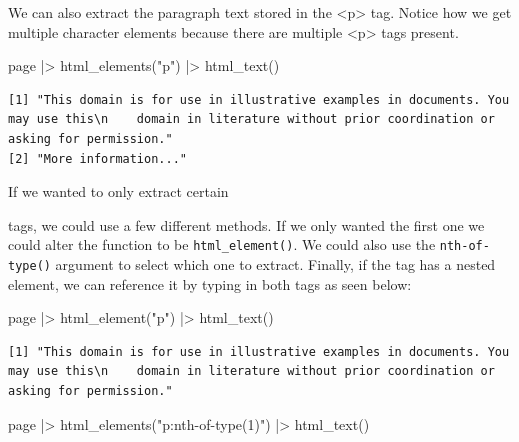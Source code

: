 \documentclass[
  letterpaper,
  DIV=11,
  numbers=noendperiod]{scrreprt}
\newenvironment{Shaded}{\begin{snugshade}}{\end{snugshade}}
\newcommand{\FunctionTok}[1]{\textcolor[rgb]{0.28,0.35,0.67}{#1}}
\newcommand{\NormalTok}[1]{\textcolor[rgb]{0.00,0.23,0.31}{#1}}
\newcommand{\SpecialCharTok}[1]{\textcolor[rgb]{0.37,0.37,0.37}{#1}}
\newcommand{\StringTok}[1]{\textcolor[rgb]{0.13,0.47,0.30}{#1}}
\begin{document}
We can also extract the paragraph text stored in the
\textless p\textgreater{} tag. Notice how we get multiple character
elements because there are multiple \textless p\textgreater{} tags
present.

\begin{Shaded}
\begin{Highlighting}[]
\NormalTok{page }\SpecialCharTok{|\textgreater{}} \FunctionTok{html\_elements}\NormalTok{(}\StringTok{"p"}\NormalTok{) }\SpecialCharTok{|\textgreater{}} \FunctionTok{html\_text}\NormalTok{()}
\end{Highlighting}
\end{Shaded}

\begin{verbatim}
[1] "This domain is for use in illustrative examples in documents. You may use this\n    domain in literature without prior coordination or asking for permission."
[2] "More information..."                                                                                                                                          
\end{verbatim}

If we wanted to only extract certain

tags, we could use a few different methods. If we only wanted the first
one we could alter the function to be \texttt{html\_element()}. We could
also use the \texttt{nth-of-type()} argument to select which one to
extract. Finally, if the tag has a nested element, we can reference it
by typing in both tags as seen below:

\begin{Shaded}
\begin{Highlighting}[]
\NormalTok{page }\SpecialCharTok{|\textgreater{}} \FunctionTok{html\_element}\NormalTok{(}\StringTok{"p"}\NormalTok{) }\SpecialCharTok{|\textgreater{}} \FunctionTok{html\_text}\NormalTok{()}
\end{Highlighting}
\end{Shaded}

\begin{verbatim}
[1] "This domain is for use in illustrative examples in documents. You may use this\n    domain in literature without prior coordination or asking for permission."
\end{verbatim}

\begin{Shaded}
\begin{Highlighting}[]
\NormalTok{page }\SpecialCharTok{|\textgreater{}} \FunctionTok{html\_elements}\NormalTok{(}\StringTok{"p:nth{-}of{-}type(1)"}\NormalTok{) }\SpecialCharTok{|\textgreater{}} \FunctionTok{html\_text}\NormalTok{()}
\end{Highlighting}
\end{Shaded}
\end{document}
